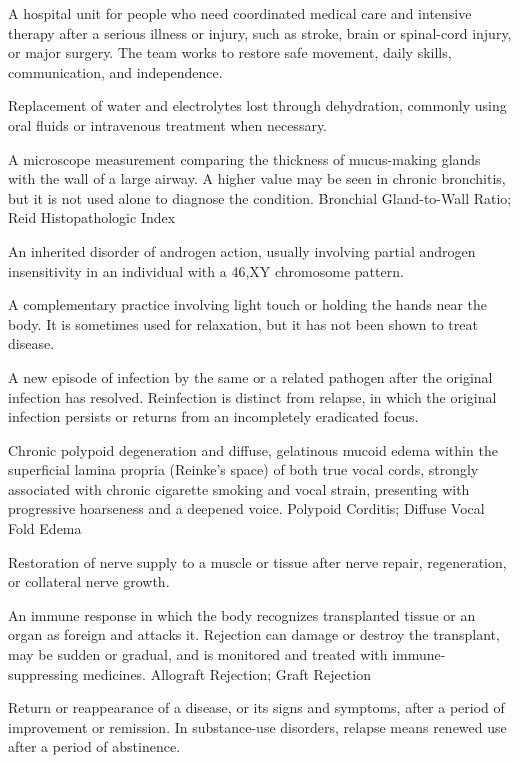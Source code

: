  A hospital unit for people who need coordinated medical care and intensive therapy after a serious illness or injury, such as stroke, brain or spinal-cord injury, or major surgery. The team works to restore safe movement, daily skills, communication, and independence.

 Replacement of water and electrolytes lost through dehydration, commonly using oral fluids or intravenous treatment when necessary.

 A microscope measurement comparing the thickness of mucus-making glands with the wall of a large airway. A higher value may be seen in chronic bronchitis, but it is not used alone to diagnose the condition.
\synonyms
Bronchial Gland-to-Wall Ratio; Reid Histopathologic Index

 An inherited disorder of androgen action, usually involving partial androgen insensitivity in an individual with a 46,XY chromosome pattern.

 A complementary practice involving light touch or holding the hands near the body. It is sometimes used for relaxation, but it has not been shown to treat disease.

 A new episode of infection by the same or a related pathogen after the original
infection has resolved. Reinfection is distinct from relapse, in which the original
infection persists or returns from an incompletely eradicated focus.

 Chronic polypoid degeneration and diffuse, gelatinous mucoid edema within the superficial lamina propria (Reinke's space) of both true vocal cords, strongly associated with chronic cigarette smoking and vocal strain, presenting with progressive hoarseness and a deepened voice.
\synonyms
Polypoid Corditis; Diffuse Vocal Fold Edema

 Restoration of nerve supply to a muscle or tissue after nerve repair, regeneration, or collateral nerve growth.

 An immune response in which the body recognizes transplanted tissue or an organ as foreign and attacks it. Rejection can damage or destroy the transplant, may be sudden or gradual, and is monitored and treated with immune-suppressing medicines.
\synonyms
Allograft Rejection; Graft Rejection

 Return or reappearance of a disease, or its signs and symptoms, after a period of improvement or remission. In substance-use disorders, relapse means renewed use after a period of abstinence.

